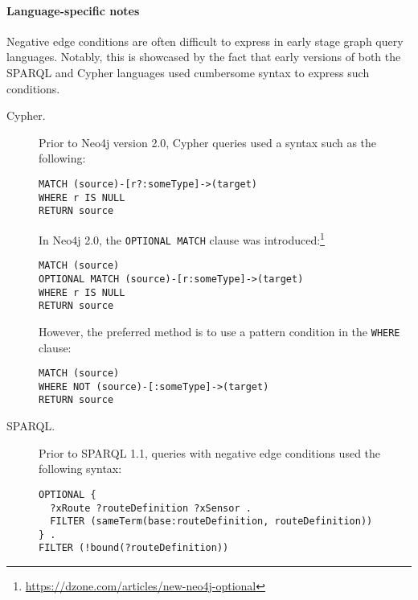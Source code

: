 \paragraph{Language-specific notes}

Negative edge conditions are often difficult to express in early stage graph query languages. Notably, this is showcased by the fact that early versions of both the SPARQL and Cypher languages used cumbersome syntax to express such conditions.

\begin{description}
\item[Cypher.]
Prior to Neo4j version 2.0, Cypher queries used a syntax such as the following:

\begin{minipage}{\linewidth}
\begin{lstlisting}[language=cypher]
MATCH (source)-[r?:someType]->(target)
WHERE r IS NULL
RETURN source
\end{lstlisting}
\end{minipage}

In Neo4j 2.0, the \lstinline[language=cypher]{OPTIONAL MATCH} clause was introduced:\footnote{\url{https://dzone.com/articles/new-neo4j-optional}}

\begin{minipage}{\linewidth}
\begin{lstlisting}[language=cypher]
MATCH (source)
OPTIONAL MATCH (source)-[r:someType]->(target)
WHERE r IS NULL
RETURN source
\end{lstlisting}
\end{minipage}

However, the preferred method is to use a pattern condition in the \lstinline[language=cypher]{WHERE} clause:

\begin{minipage}{\linewidth}
\begin{lstlisting}[language=cypher]
MATCH (source)
WHERE NOT (source)-[:someType]->(target)
RETURN source
\end{lstlisting}
\end{minipage}

\item[SPARQL.]
Prior to SPARQL 1.1, queries with negative edge conditions used the following syntax:

\begin{minipage}{\linewidth}
\begin{lstlisting}[language=sparql]
OPTIONAL {
  ?xRoute ?routeDefinition ?xSensor .
  FILTER (sameTerm(base:routeDefinition, routeDefinition))
} .
FILTER (!bound(?routeDefinition))
\end{lstlisting}
\end{minipage}


\end{description}
